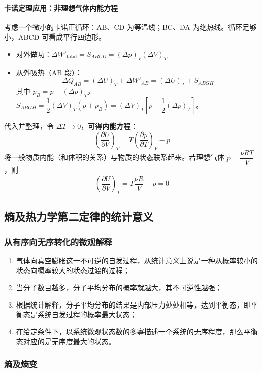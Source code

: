 \documentclass[UTF8]{ctexart}
\begin{document}
\paragraph{卡诺定理应用：非理想气体内能方程}
考虑一个微小的卡诺正循环：AB、CD 为等温线；BC、DA 为绝热线。循环足够小，ABCD 可看成平行四边形。
\begin{itemize}[leftmargin=2em]
  \item 对外做功：$\Delta W'_{\mathrm{total}}=S_{ABCD}=(\Delta p)_V(\Delta V)_T$
  \item 从外吸热（AB 段）：
  \[
  \Delta Q_{AB}=(\Delta U)_T+\Delta W'_{AB}=(\Delta U)_T+S_{ABGH}
  \]
  其中 $p_B=p-(\Delta p)_T$，$S_{ABGH}=\dfrac{1}{2}(\Delta V)_T(p+p_B)=(\Delta V)_T\!\left[p-\dfrac{1}{2}(\Delta p)_T\right]$。
\end{itemize}

代入并整理，令 $\Delta T\to 0$，可得\textbf{内能方程}：
\[
\boxed{\left(\frac{\partial U}{\partial V}\right)_T=T\left(\frac{\partial p}{\partial T}\right)_V-p}
\]
将一般物质内能（和体积的关系）与物质的状态联系起来。若理想气体 $p=\dfrac{\nu RT}{V}$，则
\[
\left(\frac{\partial U}{\partial V}\right)_T=T\frac{\nu R}{V}-p=0
\]


\subsection{熵及热力学第二定律的统计意义}

\subsubsection{从有序向无序转化的微观解释}

\begin{enumerate}[leftmargin=2em]
  \item 气体向真空膨胀这一不可逆的自发过程，从统计意义上说是一种从概率较小的状态向概率较大的状态过渡的过程；
  \item 当分子数目越多，分子平均分布的概率就越大，其不可逆性越强；
  \item 根据统计解释，分子平均分布的结果是内部压力处处相等，达到平衡态，即平衡态是系统自发过程的概率最大状态；
  \item 在给定条件下，以系统微观状态数的多寡描述一个系统的无序程度，那么平衡态对应的是无序度最大的状态。
\end{enumerate}

\subsubsection{熵及熵变}
\end{document}
